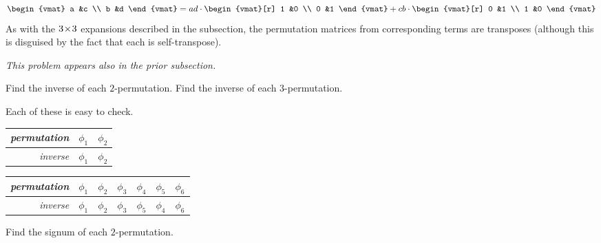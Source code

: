 \begin{exercises}
\begin{answer}
\begin{equation*}
         \begin{vmat}
            a  &c  \\
            b  &d
         \end{vmat}
         =ad\cdot\begin{vmat}[r]
                    1  &0  \\
                    0  &1
                 \end{vmat}
         +cb\cdot\begin{vmat}[r]
                   0  &1 \\
                   1  &0
                 \end{vmat}
       \end{equation*}
       As with the $3 \! \times \! 3$ expansions described in the subsection,
       the permutation matrices from corresponding terms are
       transposes (although this is disguised by the fact that each
       is self-transpose).
    \end{answer}
  \recommended \item 
    \textit{This problem appears also in the prior subsection.}
    \begin{exparts}
      \partsitem Find the inverse of each $2$-permutation.
      \partsitem Find the inverse of each $3$-permutation.
    \end{exparts}
    \begin{answer}
      Each of these is easy to check.
      \begin{exparts*}
        \partsitem 
          \begin{tabular}[t]{r|cc}
            \textit{permutation} &$\phi_1$  &$\phi_2$ \\
             \hline
            \textit{inverse}     &$\phi_1$  &$\phi_2$ 
          \end{tabular}
        \partsitem 
          \begin{tabular}[t]{r|cccccc}
            \textit{permutation} 
              &$\phi_1$ &$\phi_2$ &$\phi_3$ &$\phi_4$ &$\phi_5$ &$\phi_6$ \\
            \hline
            \textit{inverse}
              &$\phi_1$ &$\phi_2$ &$\phi_3$ &$\phi_5$ &$\phi_4$ &$\phi_6$ 
          \end{tabular}
      \end{exparts*}
    \end{answer}
  \recommended \item
    \begin{exparts}
      \partsitem Find the signum of each $2$-permutation.

\end{exparts}
\end{exercises}
